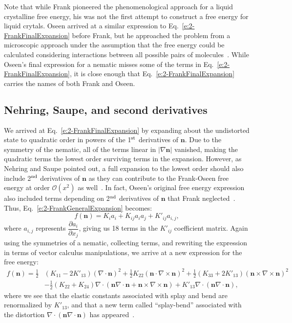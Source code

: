 Note that while Frank pioneered the phenomenological approach for a liquid crystalline free energy, his was not the first attempt to construct a free energy for liquid crytals.
Oseen arrived at a similar expression to Eq.~\ref{e:2-FrankFinalExpansion} before Frank, but he approached the problem from a microscopic approach under the assumption that the free energy could be calculated considering interactions between all possible pairs of molecules~\cite{RN205}.
While Oseen's final expression for a nematic misses some of the terms in Eq.~\ref{e:2-FrankFinalExpansion}, it is close enough that Eq.~\ref{e:2-FrankFinalExpansion} carries the names of both Frank and Oseen.


\subsection{Nehring, Saupe, and second derivatives}
We arrived at Eq.~\ref{e:2-FrankFinalExpansion} by expanding about the undistorted state to quadratic order in powers of the 1$^\textup{\rm st}$ derivatives of $\mathbf{n}$.
Due to the symmetry of the nematic, all of the terms linear in $|\nabla \mathbf{n}|$ vanished, making the quadratic terms the lowest order surviving terms in the expansion.
However, as Nehring and Saupe pointed out, a full expansion to the lowest order should also include 2$^\textup{\rm nd}$ derivatives of $\mathbf{n}$ as they can contribute to the Frank-Oseen free energy at order $\mathcal{O}(x^2)$ as well~\cite{RN60}.
In fact, Oseen's original free energy expression also included terms depending on 2$^\textup{\rm nd}$ derivatives of $\mathbf{n}$ that Frank neglected~\cite{RN205}.
Thus, Eq.~\ref{e:2-FrankGeneralExpansion} becomes:
\begin{equation}
  f(\mathbf{n}) = K_i a_i + K_{ij} a_i a_j + K'_{ij} a_{i,j},\label{e:2-NSGeneralExpansion}
\end{equation}
where $a_{i,j}$ represents $\dfrac{\partial a_i}{\partial x_j}$, giving us 18 terms in the $K'_{ij}$ coefficient matrix.
Again using the symmetries of a nematic, collecting terms, and rewriting the expression in terms of vector calculus manipulations, we arrive at a new expression for the free energy:
\begin{align}
  f(\mathbf{n}) = \frac{1}{2}&(K_{11} - 2K'_{13}) (\nabla \cdot \mathbf{n})^2 + \frac{1}{2}K_{22} (\mathbf{n} \cdot \nabla \times \mathbf{n})^2 + \frac{1}{2}(K_{33} + 2K'_{13}) (\mathbf{n} \times \nabla \times \mathbf{n})^2 \nonumber \\
    & - \frac{1}{2}(K_{22} + K_{24}) \nabla \cdot (\mathbf{n}\nabla \cdot \mathbf{n} + \mathbf{n} \times \nabla \times \mathbf{n})
      + K'_{13} \nabla \cdot (\mathbf{n} \nabla \cdot \mathbf{n}),\label{e:2-NSFinalExpansion}
\end{align}
where we see that the elastic constants associated with splay and bend are renormalized by $K'_{13}$, and that a new term called ``splay-bend'' associated with the distortion $\nabla \cdot (\mathbf{n} \nabla \cdot \mathbf{n})$ has appeared~\cite{RN60}. \\

